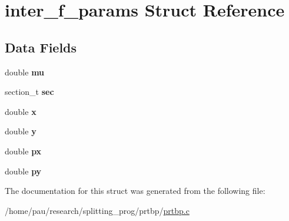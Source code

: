 \hypertarget{structinter__f__params}{
\section{inter\_\-f\_\-params Struct Reference}
\label{structinter__f__params}
}
\subsection*{Data Fields}
\begin{DoxyCompactItemize}
\item 
\hypertarget{structinter__f__params_a74577585cf12d1712ab9c57616d49205}{
double {\bfseries mu}}
\label{structinter__f__params_a74577585cf12d1712ab9c57616d49205}

\item 
\hypertarget{structinter__f__params_a8e9048bbbc09d262d70946d4658836b4}{
section\_\-t {\bfseries sec}}
\label{structinter__f__params_a8e9048bbbc09d262d70946d4658836b4}

\item 
\hypertarget{structinter__f__params_af88b946fb90d5f08b5fb740c70e98c10}{
double {\bfseries x}}
\label{structinter__f__params_af88b946fb90d5f08b5fb740c70e98c10}

\item 
\hypertarget{structinter__f__params_ab927965981178aa1fba979a37168db2a}{
double {\bfseries y}}
\label{structinter__f__params_ab927965981178aa1fba979a37168db2a}

\item 
\hypertarget{structinter__f__params_a9c1e50fd3234caf28c5f65a912b5c16a}{
double {\bfseries px}}
\label{structinter__f__params_a9c1e50fd3234caf28c5f65a912b5c16a}

\item 
\hypertarget{structinter__f__params_ad29ba68eddcdfabc5dd4e8e213a0f5cd}{
double {\bfseries py}}
\label{structinter__f__params_ad29ba68eddcdfabc5dd4e8e213a0f5cd}

\end{DoxyCompactItemize}


The documentation for this struct was generated from the following file:\begin{DoxyCompactItemize}
\item 
/home/pau/research/splitting\_\-prog/prtbp/\hyperlink{prtbp_8c}{prtbp.c}\end{DoxyCompactItemize}
